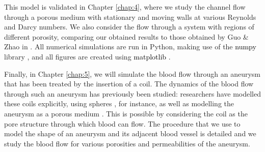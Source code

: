 \documentclass[a4paper, 11pt]{report}
\begin{document}


This model is validated in Chapter \ref{chap:4}, where we study the channel flow through a porous medium with stationary and moving walls at various Reynolds and Darcy numbers. We also consider the flow through a system with regions of different porosity, comparing our obtained results to those obtained by Guo \& Zhao in \cite{guo+zhao}. All numerical simulations are run in Python, making use of the {\selectfont\textcolor{black}{numpy}} library \cite{2020NumPy-Array}, and all figures are created using {\selectfont\textcolor{black}{matplotlib}} \cite{hunter2007matplotlib}. 

Finally, in Chapter \ref{chap:5}, we will simulate the blood flow through an aneurysm that has been treated by the insertion of a coil. The dynamics of the blood flow through such an aneurysm has previously been studied: researchers have modelled these coils explicitly, using spheres \cite{BYUN2004}, for instance, as well as modelling the aneurysm as a porous medium \cite{kakalis2008}. This is possible by considering the coil as the pore structure through which blood can flow. The procedure that we use to model the shape of an aneurysm and its adjacent blood vessel is detailed and we study the blood flow for various porosities and permeabilities of the aneurysm.
\end{document}
